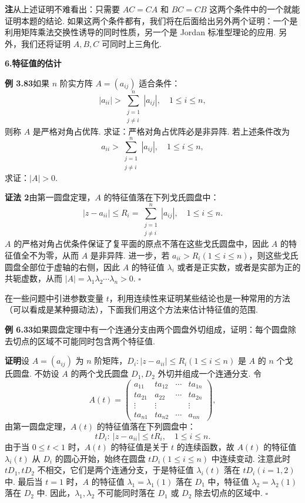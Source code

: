 \documentclass[UTF8,12pt,a4paper,fontset=fandol]{ctexart}
\begin{document}
\noindent\textbf{注}\quad 从上述证明不难看出：只需要 $AC=CA$ 和 $BC=CB$ 这两个条件中的一个就能证明本题的结论. 如果这两个条件都有，我们将在后面给出另外两个证明：一个是利用矩阵乘法交换性诱导的同时性质，另一个是 Jordan 标准型理论的应用. 另外，我们还将证明 $A,B,C$ 可同时上三角化.

\noindent\textbf{6.\quad 特征值的估计}

\noindent\textbf{例 3.83}\quad 如果 $n$ 阶实方阵 $A=(a_{ij})$ 适合条件：
\[
|a_{ii}|>\sum_{\substack{j=1\\j\ne i}}^n |a_{ij}|,\quad 1\le i\le n,
\]
则称 $A$ 是严格对角占优阵. 求证：严格对角占优阵必是非异阵. 若上述条件改为
\[
a_{ii}>\sum_{\substack{j=1\\j\ne i}}^n |a_{ij}|,\quad 1\le i\le n,
\]
求证：$|A|>0$.

\noindent\textbf{证法 2}\quad 由第一圆盘定理，$A$ 的特征值落在下列戈氏圆盘中：
\[
|z-a_{ii}|\le R_i=\sum_{\substack{j=1\\j\ne i}}^n |a_{ij}|,\quad 1\le i\le n.
\]
$A$ 的严格对角占优条件保证了复平面的原点不落在这些戈氏圆盘中，因此 $A$ 的特征值全不为零，从而 $A$ 是非异阵. 进一步，若 $a_{ii}>R_i(1\le i\le n)$，则这些戈氏圆盘全部位于虚轴的右侧，因此 $A$ 的特征值 $\lambda_i$ 或者是正实数，或者是实部为正的共轭虚数，从而 $|A|=\lambda_1\lambda_2\cdots\lambda_n>0$. $\square$

在一些问题中引进参数变量 $t$，利用连续性来证明某些结论也是一种常用的方法（可以看成是某种摄动法），下面我们用这个方法来估计特征值的范围.

\noindent\textbf{例 6.33}\quad 如果圆盘定理中有一个连通分支由两个圆盘外切组成，证明：每个圆盘除去切点的区域不可能同时包含两个特征值.

\noindent\textbf{证明}\quad 设 $A=(a_{ij})$ 为 $n$ 阶矩阵，$D_i:|z-a_{ii}|\le R_i(1\le i\le n)$ 是 $A$ 的 $n$ 个戈氏圆盘. 不妨设 $A$ 的两个戈氏圆盘 $D_1,D_2$ 外切并组成一个连通分支. 令
\[
A(t)=\left(\begin{array}{cccc}
a_{11} & ta_{12} & \cdots & ta_{1n}\\
ta_{21} & a_{22} & \cdots & ta_{2n}\\
\vdots & \vdots & & \vdots\\
ta_{n1} & ta_{n2} & \cdots & a_{nn}
\end{array}\right),
\]
由第一圆盘定理，$A(t)$ 的特征值落在下列圆盘中：
\[
tD_i:\ |z-a_{ii}|\le tR_i,\quad 1\le i\le n.
\]
由于当 $0\le t<1$ 时，$A(t)$ 的特征值是关于 $t$ 的连续函数，故 $A(t)$ 的特征值 $\lambda_i(t)$ 从 $D_i$ 的圆心开始，始终在圆盘 $tD_i(1\le i\le n)$ 中连续变动. 注意此时 $tD_1,tD_2$ 不相交，它们是两个连通分支，于是特征值 $\lambda_i(t)$ 落在 $tD_i(i=1,2)$ 中. 最后当 $t=1$ 时，$A$ 的特征值 $\lambda_1=\lambda_1(1)$ 落在 $D_1$ 中，特征值 $\lambda_2=\lambda_2(1)$ 落在 $D_2$ 中. 因此，$\lambda_1,\lambda_2$ 不可能同时落在 $D_1$ 或 $D_2$ 除去切点的区域中. $\square$
\end{document}
